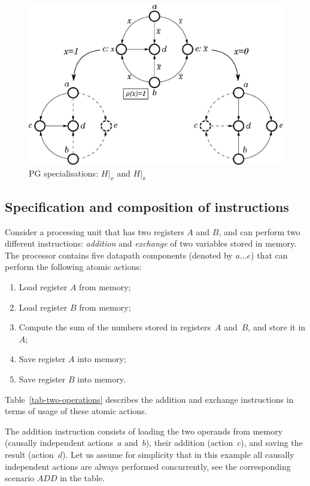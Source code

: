 \begin{figure}
\begin{centering}
\includegraphics[width=0.85\columnwidth]{fig/cpog_projections_2}
\par\end{centering}

\caption{\label{fig:Specialisations}PG specialisations: $H\vert_{x}$ and
$H\vert_{\overline{x}}$}
\end{figure}



\subsection{Specification and composition of instructions}

Consider a processing unit that has two registers $A$ and $B$, and
can perform two different instructions: \emph{addition} and \emph{exchange}
of two variables stored in memory. The processor contains five datapath
components (denoted by $a\dots e$) that can perform the following
atomic actions:\renewcommand{\labelenumi}{\alph{enumi})}
\begin{enumerate}
\item Load register $A$ from memory;
\item Load register $B$ from memory;
\item Compute the sum of the numbers stored in registers~$A$ and~$B$,
and store it in $A$;
\item Save register $A$ into memory;
\item Save register $B$ into memory.
\end{enumerate}
\renewcommand{\labelenumi}{\arabic{enumi}.}Table~\ref{tab-two-operations}
describes the addition and exchange instructions in terms of usage
of these atomic actions.

The addition instruction consists of loading the two operands from
memory (causally independent actions~$a$ and~$b$), their addition
(action~$c$), and saving the result (action~$d$). Let us assume
for simplicity that in this example all causally independent actions
are always performed concurrently, see the corresponding scenario
$\mathit{ADD}$ in the table.

